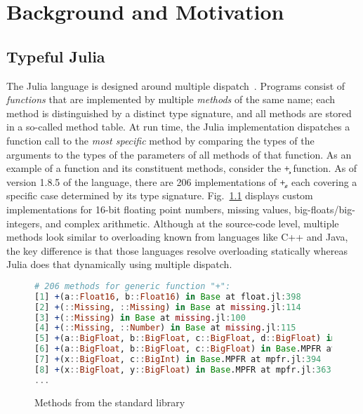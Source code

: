 
\chapter{Background and Motivation}
\label{chap:back}

\section{Typeful Julia}%
\label{sec:julia-back}

The Julia language is designed around multiple dispatch~\cite{BezansonEKS17}.
Programs consist of \emph{functions} that are implemented by multiple
\emph{methods} of the same name; each method is distinguished by a distinct type
signature, and all methods are stored in a so-called method table.
At run time, the Julia implementation dispatches a function call to
the \emph{most specific} method by comparing the types of the arguments to the
types of the parameters of all methods of that function. As an example of a
function and its constituent methods, consider the \c{+} function. 
As of version 1.8.5 of the
language, there are 206 implementations of \c{+}, each covering a
specific case determined by its type signature. Fig.~\ref{plus} displays custom
implementations for 16-bit floating point numbers, missing values,
big-floats/big-integers, and complex arithmetic.
Although at the source-code level, multiple methods look similar to
overloading known from languages like C++ and Java, the key difference is that
those languages resolve overloading statically whereas Julia does that
dynamically using multiple dispatch.

\begin{figure}
\begin{lstlisting}[language=julia]
# 206 methods for generic function "+":
[1] +(a::Float16, b::Float16) in Base at float.jl:398
[2] +(::Missing, ::Missing) in Base at missing.jl:114
[3] +(::Missing) in Base at missing.jl:100
[4] +(::Missing, ::Number) in Base at missing.jl:115
[5] +(a::BigFloat, b::BigFloat, c::BigFloat, d::BigFloat) in Base.MPFR at mpfr.jl:541
[6] +(a::BigFloat, b::BigFloat, c::BigFloat) in Base.MPFR at mpfr.jl:535
[7] +(x::BigFloat, c::BigInt) in Base.MPFR at mpfr.jl:394
[8] +(x::BigFloat, y::BigFloat) in Base.MPFR at mpfr.jl:363
...
\end{lstlisting}
\caption{Methods from the standard library}\label{plus}
\end{figure}

